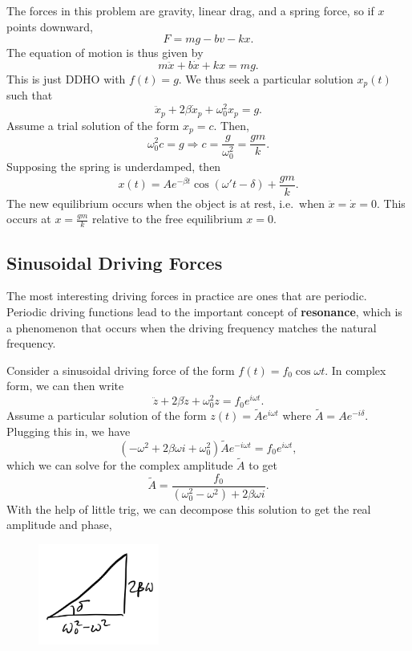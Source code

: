 \documentclass[
  letterpaper,
  DIV=11,
  numbers=noendperiod]{scrreprt}
\begin{document}
The forces in this problem are gravity, linear drag, and a spring force,
so if \(x\) points downward, \[
F = mg - bv - kx.
\] The equation of motion is thus given by \[
m \ddot x + b \dot x + kx = mg.
\] This is just DDHO with \(f(t) = g\). We thus seek a particular
solution \(x_p(t)\) such that \[
\ddot x_p + 2\beta\dot x_p + \omega_0^2 x_p = g.
\] Assume a trial solution of the form \(x_p = c\). Then, \[
\omega_0^2 c = g \Longrightarrow c = \frac{g}{\omega_0^2} = \frac{gm}{k}.
\] Supposing the spring is underdamped, then \[
x(t) = Ae^{-\beta t} \cos(\omega' t - \delta) + \frac{gm}{k}.
\] The new equilibrium occurs when the object is at rest, i.e.~when
\(\ddot x = \dot x = 0\). This occurs at \(x = \frac{gm}{k}\) relative
to the free equilibrium \(x=0\).

\hypertarget{sinusoidal-driving-forces}{%
\subsection{Sinusoidal Driving Forces}\label{sinusoidal-driving-forces}}

The most interesting driving forces in practice are ones that are
periodic. Periodic driving functions lead to the important concept of
\textbf{resonance}, which is a phenomenon that occurs when the driving
frequency matches the natural frequency.

Consider a sinusoidal driving force of the form
\(f(t) = f_0 \cos\omega t\). In complex form, we can then write \[
\ddot z + 2\beta\dot z + \omega_0^2 z = f_0 e^{i \omega t}.
\] Assume a particular solution of the form
\(z(t) = \tilde A e^{i \omega t}\) where \(\tilde A = Ae^{-i\delta}\).
Plugging this in, we have \[
(-\omega^2 + 2\beta\omega i + \omega_0^2)\tilde A e^{-i\omega t} = f_0 e^{i\omega t},
\] which we can solve for the complex amplitude \(\tilde A\) to get \[
\tilde A = \frac{f_0}{(\omega_0^2-\omega^2) + 2\beta\omega i}.
\] With the help of little trig, we can decompose this solution to get
the real amplitude and phase,

\begin{figure}

{\centering \includegraphics[width=1.5625in,height=\textheight]{classical-mechanics/./resources/image-20230215141606559.png}

}

\end{figure}
\end{document}
